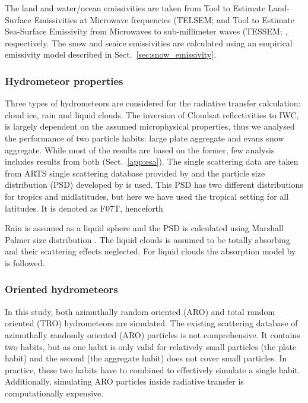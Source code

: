 \documentclass[amt, manuscript]{copernicus}
\begin{document}
The land and water/ocean emissivities are taken from Tool to Estimate Land-Surface Emissivities at Microwave frequencies (TELSEM; \citep{aires2011tool} and  Tool to Estimate Sea-Surface Emissivity from Microwaves to sub-millimeter waves (TESSEM;
\citep{prigent2017sea}, respectively. The snow and seaice emissivities are calculated using an empirical emissivity model described in Sect.~\ref{sec:snow_emissivity}.


\subsubsection{Hydrometeor properties}
\label{sec:hydrometeor_prop}

Three types of hydrometeors are considered for the radiative transfer calculation: cloud ice, rain and liquid clouds. The inversion of Cloudsat reflectivities to IWC, is largely dependent on the assumed microphysical properties, thus we analysed the performance of two particle habits: large plate aggregate and evans snow aggregate. While most of the results are based on the former, few analysis includes results from both (Sect.~\ref{app:esa}). The single scattering data are taken from ARTS single scattering database provided by \citet{eriksson:agene:18} and the particle size distribution (PSD) developed by \citet{field:snows:07} is used. This PSD has two different distributions for tropics and midlatitudes, but here we have used the tropical setting for all latitudes. It is denoted as F07T, henceforth

Rain is assumed as a liquid sphere and the PSD is calculated using Marshall Palmer size distribution \citep{marshall:thedi:48}. The liquid clouds is assumed to be totally absorbing and their scattering effects neglected. For liquid clouds the absorption model by \citet{ellison2007permittivity} is followed.  


\subsubsection{Oriented hydrometeors}
\label{sec:scaling_factor}

In this study, both azimuthally random oriented (ARO) and total random oriented (TRO) hydrometeors are simulated. The existing scattering database of azimuthally randomly oriented (ARO) particles \citep{brath:micro:20} is not comprehensive. It contains two habits, but as one habit is only valid for relatively small particles (the plate habit) and the second (the aggregate habit) does not cover small particles. In practice, these two habits have to combined to effectively simulate a single habit. Additionally, simulating ARO particles inside radiative transfer is computationally expensive.
\end{document}
